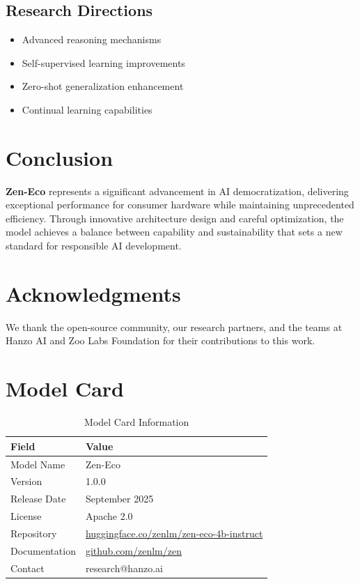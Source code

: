 \documentclass[11pt,a4paper]{article}
\begin{document}
\subsection{Research Directions}
\begin{itemize}
    \item Advanced reasoning mechanisms
    \item Self-supervised learning improvements
    \item Zero-shot generalization enhancement
    \item Continual learning capabilities
\end{itemize}

\section{Conclusion}

\textbf{Zen-Eco} represents a significant advancement in AI democratization, 
delivering exceptional performance for consumer hardware while maintaining 
unprecedented efficiency. Through innovative architecture design and careful optimization, 
the model achieves a balance between capability and sustainability that sets a new standard 
for responsible AI development.

\section*{Acknowledgments}

We thank the open-source community, our research partners, and the teams at Hanzo AI and 
Zoo Labs Foundation for their contributions to this work.

\appendix

\section{Model Card}

\begin{table}[H]
\centering
\begin{tabular}{ll}
\toprule
\textbf{Field} & \textbf{Value} \\
\midrule
Model Name & Zen-Eco \\
Version & 1.0.0 \\
Release Date & September 2025 \\
License & Apache 2.0 \\
Repository & \href{https://huggingface.co/zenlm/zen-eco-4b-instruct}{huggingface.co/zenlm/zen-eco-4b-instruct} \\
Documentation & \href{https://github.com/zenlm/zen}{github.com/zenlm/zen} \\
Contact & research@hanzo.ai \\
\bottomrule
\end{tabular}
\caption{Model Card Information}
\end{table}
\end{document}
